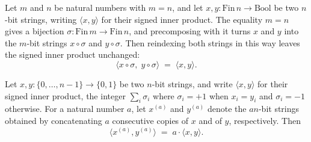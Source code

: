\begin{theorem}
\label{CommunicationComplexity.BitString.signedInner_comp_cast}
\leanok
{}
Let $m$ and $n$ be natural numbers with $m = n$, and let $x, y \colon \mathrm{Fin}\,n
\to \mathrm{Bool}$ be two $n$-bit strings, writing $\langle x, y\rangle$ for their
signed inner product. The equality $m = n$ gives a bijection $\sigma \colon
\mathrm{Fin}\,m \to \mathrm{Fin}\,n$, and precomposing with it turns $x$ and $y$ into
the $m$-bit strings $x \circ \sigma$ and $y \circ \sigma$. Then reindexing both strings
in this way leaves the signed inner product unchanged:
\[
  \langle x \circ \sigma,\; y \circ \sigma\rangle \;=\; \langle x, y\rangle.
\]
\end{theorem}

\begin{theorem}
\label{CommunicationComplexity.BitString.signedInner_amplify}
\leanok
{}
Let $x, y \colon \{0, \dots, n-1\} \to \{0,1\}$ be two $n$-bit strings, and write
$\langle x, y\rangle$ for their signed inner product, the integer $\sum_{i} \sigma_i$
where $\sigma_i = +1$ when $x_i = y_i$ and $\sigma_i = -1$ otherwise. For a natural
number $a$, let $x^{(a)}$ and $y^{(a)}$ denote the $an$-bit strings obtained by
concatenating $a$ consecutive copies of $x$ and of $y$, respectively. Then
\[
  \langle x^{(a)}, y^{(a)}\rangle \;=\; a \cdot \langle x, y\rangle.
\]
\end{theorem}
